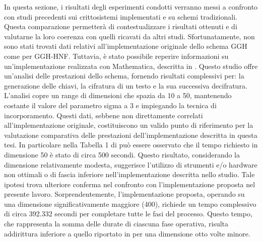 In questa sezione, i risultati degli esperimenti condotti verranno messi a confronto 
con studi precedenti sui crittosistemi implementati e su schemi tradizionali. 
Questa comparazione permetterà di 
contestualizzare i risultati ottenuti e di valutarne la loro coerenza con quelli ricavati
da altri studi. 
Sfortunatamente, non sono stati trovati dati relativi all'implementazione originale dello schema 
GGH come per GGH-HNF. Tuttavia, è stato possibile reperire informazioni su un'implementazione realizzata 
con Mathematica, descritta in \cite{GGH16}. Questo studio offre un'analisi delle prestazioni 
dello schema, fornendo risultati complessivi per: la generazione delle chiavi, la cifratura 
di un testo e la sua successiva decifratura. L'analisi copre un range di dimensioni che 
spazia da 10 a 50, mantenendo costante il valore del parametro sigma a 3 e 
impiegando la tecnica di incorporamento. Questi dati, sebbene non direttamente correlati 
all'implementazione originale, costituiscono un valido punto di riferimento per la valutazione 
comparativa delle prestazioni dell'implementazione descritta in questa tesi. In particolare 
nella Tabella 1 di \cite[Sezione 6]{GGH16} può essere osservato che il tempo richiesto 
in dimensione 50 è stato di circa 500 secondi. 
Questo risultato, considerando la dimensione relativamente modesta, suggerisce l'utilizzo 
di strumenti e/o hardware non ottimali o di fascia inferiore nell'implementazione descritta 
nello studio. Tale ipotesi trova ulteriore conferma nel confronto con l'implementazione 
proposta nel presente lavoro. Sorprendentemente, l'implementazione proposta, operando su 
una dimensione significativamente maggiore (400), richiede un tempo complessivo di circa 
392.332 secondi per completare tutte le fasi del processo. Questo tempo, che rappresenta 
la somma delle durate di ciascuna fase operativa, risulta addirittura inferiore a quello 
riportato in \cite{GGH16} per una dimensione otto volte minore. 

